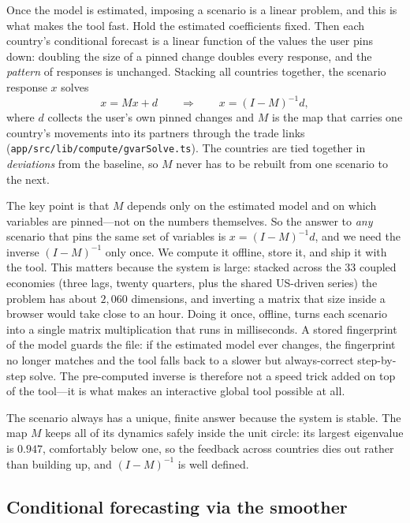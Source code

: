 \documentclass[11pt]{article}
\newcommand{\code}[1]{\texttt{\small #1}}
\begin{document}
Once the model is estimated, imposing a scenario is a linear problem, and this is what makes the tool
fast. Hold the estimated coefficients fixed. Then each country's conditional forecast is a linear function
of the values the user pins down: doubling the size of a pinned change doubles every response, and the
\emph{pattern} of responses is unchanged. Stacking all countries together, the scenario response $x$
solves
\begin{equation}
  x = M x + d
  \qquad\Longrightarrow\qquad
  x = (I - M)^{-1} d ,
  \label{eq:coupling}
\end{equation}
where $d$ collects the user's own pinned changes and $M$ is the map that carries one country's movements
into its partners through the trade links (\code{app/src/lib/compute/gvarSolve.ts}). The countries are
tied together in \emph{deviations} from the baseline, so $M$ never has to be rebuilt from one scenario to
the next.

The key point is that $M$ depends only on the estimated model and on which variables are pinned---not on
the numbers themselves. So the answer to \emph{any} scenario that pins the same set of variables is
$x = (I-M)^{-1}d$, and we need the inverse $(I-M)^{-1}$ only once. We compute it offline, store it, and
ship it with the tool. This matters because the system is large: stacked across the $33$ coupled economies
(three lags, twenty quarters, plus the shared US-driven series) the problem has about $2{,}060$
dimensions, and inverting a matrix that size inside a browser would take close to an hour. Doing it once,
offline, turns each scenario into a single matrix multiplication that runs in milliseconds. A stored
fingerprint of the model guards the file: if the estimated model ever changes, the fingerprint no longer
matches and the tool falls back to a slower but always-correct step-by-step solve. The pre-computed
inverse is therefore not a speed trick added on top of the tool---it is what makes an interactive global
tool possible at all.

The scenario always has a unique, finite answer because the system is stable. The map $M$ keeps all of its
dynamics safely inside the unit circle: its largest eigenvalue is $0.947$, comfortably below one, so the
feedback across countries dies out rather than building up, and $(I-M)^{-1}$ is well defined.

\subsection{Conditional forecasting via the smoother}
\label{sub:cond}
\end{document}
